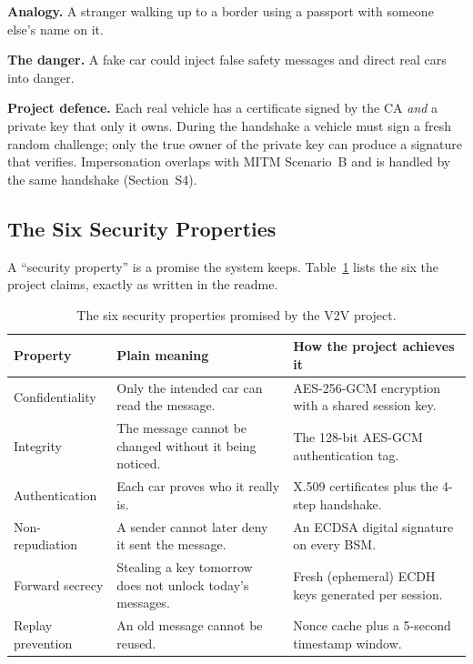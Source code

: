 \documentclass[11pt,a4paper]{article}
\begin{document}
\textbf{Analogy.} A stranger walking up to a border using a passport with
someone else's name on it.

\textbf{The danger.} A fake car could inject false safety messages and direct
real cars into danger.

\textbf{Project defence.} Each real vehicle has a certificate signed by the CA
\emph{and} a private key that only it owns. During the handshake a vehicle must
sign a fresh random challenge; only the true owner of the private key can
produce a signature that verifies. Impersonation overlaps with MITM Scenario~B
and is handled by the same handshake (Section~S4).

\subsection{The Six Security Properties}
A ``security property'' is a promise the system keeps. Table~\ref{tab:props}
lists the six the project claims, exactly as written in the readme.

\begin{table}[h]
\centering
\small
\begin{tabular}{@{}p{2.9cm} p{5.0cm} p{5.6cm}@{}}
\toprule
\textbf{Property} & \textbf{Plain meaning} & \textbf{How the project achieves it}\\
\midrule
Confidentiality & Only the intended car can read the message. &
AES-256-GCM encryption with a shared session key.\\
Integrity & The message cannot be changed without it being noticed. &
The 128-bit AES-GCM authentication tag.\\
Authentication & Each car proves who it really is. &
X.509 certificates plus the 4-step handshake.\\
Non-repudiation & A sender cannot later deny it sent the message. &
An ECDSA digital signature on every BSM.\\
Forward secrecy & Stealing a key tomorrow does not unlock today's messages. &
Fresh (ephemeral) ECDH keys generated per session.\\
Replay prevention & An old message cannot be reused. &
Nonce cache plus a 5-second timestamp window.\\
\bottomrule
\end{tabular}
\caption{The six security properties promised by the V2V project.}
\label{tab:props}
\end{table}
\end{document}
